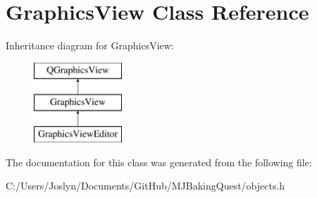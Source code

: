 \hypertarget{class_graphics_view}{\section{Graphics\-View Class Reference}
\label{class_graphics_view}
}
Inheritance diagram for Graphics\-View\-:\begin{figure}[H]
\begin{center}
\leavevmode
\includegraphics[height=3.000000cm]{class_graphics_view}
\end{center}
\end{figure}


The documentation for this class was generated from the following file\-:\begin{DoxyCompactItemize}
\item 
C\-:/\-Users/\-Joslyn/\-Documents/\-Git\-Hub/\-M\-J\-Baking\-Quest/objects.\-h\end{DoxyCompactItemize}
